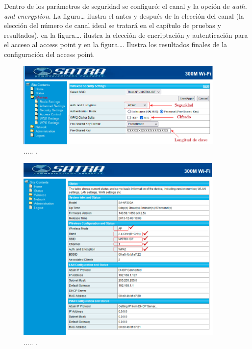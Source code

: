 Dentro de los parámetros de seguridad se configuró: el canal y la opción de \emph{auth. and encryption}. La figura… ilustra el antes y después de la elección del canal (la elección del número de canal ideal se tratará en el capítulo de pruebas y resultados), en la figura…. ilustra la elección de encriptación y autenticación para el acceso al access point y en la figura…. Ilustra los resultados finales de la configuración del access point.
\vspace{0.2cm}
\begin{figure}[htpb]
\centering 
\includegraphics[width=0.91\textwidth]{./Figures/encriptacion.png}
\caption{..... .}
\label{fig:encriptacion}
\end{figure}
\vspace{0.2cm}
\begin{figure}[htpb]
\centering 
\includegraphics[width=0.91\textwidth]{./Figures/configuracionfinal.png}
\caption{..... .}
\label{fig:configuracionfinal}
\end{figure}

